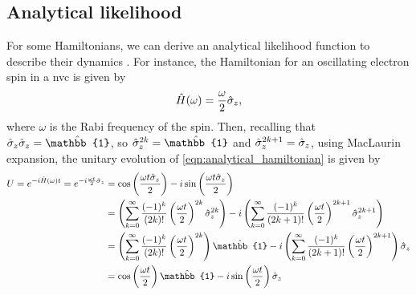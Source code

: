 \subsection{Analytical likelihood}\label{sec:analytical_likelihood}
For some Hamiltonians, we can derive an analytical \gls{likelihood} function to describe their dynamics
    \cite{sergeevich2011characterization, ferrie2013best}.
For instance, the Hamiltonian for an oscillating electron spin in a \acrlong{nvc} 
    is given by
    \begin{equation}
        \label{eqn:analytical_hamiltonian}
        \hat{H}(\omega) = \frac{\omega}{2} \hat{\sigma}_z,
    \end{equation}
    where $\omega$ is the Rabi frequency of the spin. 
Then, recalling that $\s_z \s_z = \hat{\mathbb{1}}$, so $\s_z^{2k}=\hat{\mathbb{1}}$ and $\hat{\sigma}_z^{2k+1} = \hat{\sigma}_z$, 
    using MacLaurin expansion, the unitary evolution of \cref{eqn:analytical_hamiltonian} is given by 
\begin{align}
    \begin{split}
        U = e^{-i \hat{H}(\omega)t} = e^{-i \frac{\omega t}{2} \s_z}  
        &= \cos\bk{ \frac{\omega t \s_z}{2}} 
        - i \sin\bk{ \frac{\omega t \s_z}{2}} \\
        &= \bk{ \sum\limits_{k=0}^{\infty} \frac{(-1)^k}{(2k)!} \bk{ \frac{\omega t}{2} }^{2k} \s_z^{2k}  }
        - i \bk{\sum\limits_{k=0}^{\infty} \frac{(-1)^k}{(2k+1)!} \bk{ \frac{\omega t}{2} }^{2k+1} \s_z^{2k+1}} \\
        &=  \bk{\sum\limits_{k=0}^{\infty} \frac{(-1)^k}{(2k)!} \bk{ \frac{\omega t}{2} }^{2k}} \hat{\mathbb{1}} 
        - i \bk{\sum\limits_{k=0}^{\infty} \frac{(-1)^k}{(2k+1)!} \bk{ \frac{\omega t}{2} }^{2k+1} } \s_z \\
        &= \cos\bk{\frac{\omega t}{2}}\hat{\mathbb{1}} - i \sin\bk{\frac{\omega t}{2}} \s_z
    \end{split}
\end{align}
    

